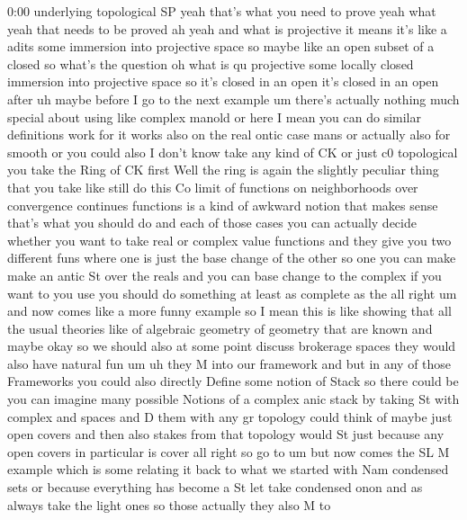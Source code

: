 \begin{unfinished}{0:00}
underlying  topological  SP  yeah  that's
what  you  need  to  prove  yeah  what  yeah
that  needs  to  be  proved  ah  yeah  and  what
is  projective  it  means  it's  like  a  adits
some  immersion  into  projective  space  so
maybe  like  an  open  subset  of  a  closed  so
what's  the  question  oh  what  is  qu
projective  some  locally  closed  immersion
into  projective
space  so  it's  closed  in  an  open  it's
closed  in  an  open  after
uh
maybe  before  I  go  to  the  next  example  um
there's  actually  nothing  much  special
about  using  like  complex  manold
or  here  I  mean  you  can  do  similar
definitions  work
for  it  works  also  on  the  real  ontic  case
mans  or  actually  also  for  smooth  or  you
could  also  I  don't  know  take  any  kind  of
CK  or  just  c0
topological  you  take  the  Ring  of  CK
first  Well  the  ring  is  again  the
slightly  peculiar  thing  that  you  take
like  still  do  this  Co  limit  of  functions
on
neighborhoods  over  convergence  continues
functions  is  a  kind  of  awkward  notion
that  makes
sense  that's  what  you  should
do  and  each  of  those  cases  you  can
actually
decide  whether  you  want  to  take  real  or
complex  value  functions  and  they  give
you  two  different
funs  where  one  is  just  the  base  change
of  the  other  so  one  you  can  make  make  an
antic  St  over  the  reals  and  you  can  base
change  to  the  complex  if  you  want  to  you
use
you  should  do
something  at  least  as  complete  as
the  all  right
um  and  now
comes  like  a  more  funny  example  so  I
mean  this  is
like  showing  that  all  the  usual  theories
like  of  algebraic  geometry  of  geometry
that  are  known  and  maybe  okay  so  we
should  also  at  some  point  discuss
brokerage  spaces  they  would  also  have
natural  fun
um  uh  they  M  into  our  framework  and  but
in  any  of  those  Frameworks  you  could
also  directly  Define  some  notion  of
Stack  so  there  could  be  you  can  imagine
many  possible  Notions  of  a  complex  anic
stack  by  taking  St  with  complex  and
spaces  and  D  them  with  any  gr  topology
could  think  of  maybe  just  open  covers
and  then  also  stakes  from  that  topology
would  St  just  because  any  open  covers  in
particular  is
cover
all  right  so  go
to
um  but  now  comes  the  SL  M  example  which
is  some  relating  it  back  to  what  we
started  with  Nam  condensed  sets  or
because  everything  has  become  a  St  let
take  condensed
onon  and  as  always  take  the  light
ones  so  those  actually  they  also  M  to

\end{unfinished}
